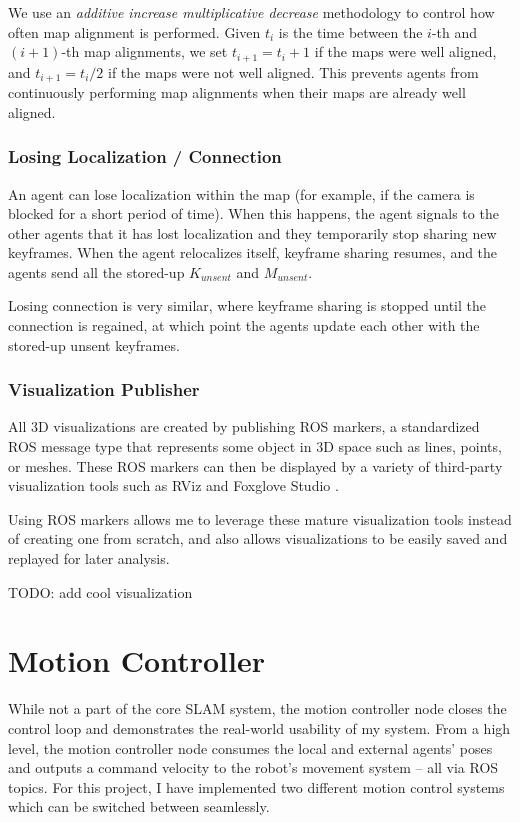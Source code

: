 We use an \textit{additive increase multiplicative decrease} methodology to control how often map alignment is performed. Given $t_i$ is the time between the $i$-th and $(i+1)$-th map alignments, we set $t_{i+1} = t_i + 1$ if the maps were well aligned, and $t_{i+1} = t_i / 2$ if the maps were not well aligned. This prevents agents from continuously performing map alignments when their maps are already well aligned.

\subsubsection{Losing Localization / Connection}
\label{sec:losing-localization-or-connection}
An agent can lose localization within the map (for example, if the camera is blocked for a short period of time). When this happens, the agent signals to the other agents that it has lost localization and they temporarily stop sharing new keyframes. When the agent relocalizes itself, keyframe sharing resumes, and the agents send all the stored-up $K_{unsent}$ and $M_{unsent}$.

Losing connection is very similar, where keyframe sharing is stopped until the connection is regained, at which point the agents update each other with the stored-up unsent keyframes.

\subsubsection{Visualization Publisher}
\label{sec:visualization-publisher}
All 3D visualizations are created by publishing ROS markers, a standardized ROS message type that represents some object in 3D space such as lines, points, or meshes. These ROS markers can then be displayed by a variety of third-party visualization tools such as RViz \autocite{10.1007/s11235-015-0034-5} and Foxglove Studio \autocite{foxgloveStudio}.

Using ROS markers allows me to leverage these mature visualization tools instead of creating one from scratch, and also allows visualizations to be easily saved and replayed for later analysis.

TODO: add cool visualization

\section{Motion Controller}
\label{sec:motion-controller}
While not a part of the core SLAM system, the motion controller node closes the control loop and demonstrates the real-world usability of my system. From a high level, the motion controller node consumes the local and external agents' poses and outputs a command velocity to the robot's movement system – all via ROS topics. For this project, I have implemented two different motion control systems which can be switched between seamlessly.

